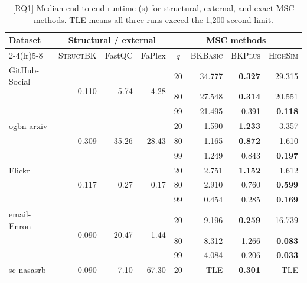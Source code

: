 \documentclass[sigconf, nonacm]{acmart}
\newcommand{\StructBK}{\textsc{Struct\-BK}}
\begin{document}
\begin{table}[!t]
\footnotesize
\centering
\caption{[RQ1] Median end-to-end runtime (s) for structural, external, and exact MSC methods. TLE means all three runs exceed the 1,200-second limit.}
\label{tab:main-runtime}
\vspace{-3mm}
\setlength{\tabcolsep}{1.55pt}
\renewcommand{\arraystretch}{1.02}
\begin{tabular*}{0.99\columnwidth}{@{\extracolsep{\fill}}lrrrcrrr@{}}
\toprule
\multirow{2}{*}{Dataset} & \multicolumn{3}{c}{Structural / external} & \multicolumn{4}{c}{MSC methods} \\
\cmidrule(lr){2-4}\cmidrule(lr){5-8}
& \StructBK & FastQC & FaPlex & $q$ & \textsc{BKBasic} & \textsc{BKPlus} & \textsc{HighSim} \\
\midrule
GitHub-Social & \multirow{3}{*}{0.110} & \multirow{3}{*}{5.74} & \multirow{3}{*}{4.28} & 20 & 34.777 & \cellcolor{bestgreen}\textbf{0.327} & 29.315 \\
 & & & & 80 & 27.548 & \cellcolor{bestgreen}\textbf{0.314} & 20.551 \\
 & & & & 99 & 21.495 & 0.391 & \cellcolor{bestgreen}\textbf{0.118} \\
\midrule
ogbn-arxiv & \multirow{3}{*}{0.309} & \multirow{3}{*}{35.26} & \multirow{3}{*}{28.43} & 20 & 1.590 & \cellcolor{bestgreen}\textbf{1.233} & 3.357 \\
 & & & & 80 & 1.165 & \cellcolor{bestgreen}\textbf{0.872} & 1.610 \\
 & & & & 99 & 1.249 & 0.843 & \cellcolor{bestgreen}\textbf{0.197} \\
\midrule
Flickr & \multirow{3}{*}{0.117} & \multirow{3}{*}{0.27} & \multirow{3}{*}{0.17} & 20 & 2.751 & \cellcolor{bestgreen}\textbf{1.152} & 1.612 \\
 & & & & 80 & 2.910 & 0.760 & \cellcolor{bestgreen}\textbf{0.599} \\
 & & & & 99 & 0.454 & 0.285 & \cellcolor{bestgreen}\textbf{0.169} \\
\midrule
email-Enron & \multirow{3}{*}{0.090} & \multirow{3}{*}{20.47} & \multirow{3}{*}{1.44} & 20 & 9.196 & \cellcolor{bestgreen}\textbf{0.259} & 16.739 \\
 & & & & 80 & 8.312 & 1.266 & \cellcolor{bestgreen}\textbf{0.083} \\
 & & & & 99 & 4.084 & 0.206 & \cellcolor{bestgreen}\textbf{0.033} \\
\midrule
sc-nasasrb & \multirow{3}{*}{0.090} & \multirow{3}{*}{7.10} & \multirow{3}{*}{67.30} & 20 & TLE & \cellcolor{bestgreen}\textbf{0.301} & TLE \\

\end{tabular*}
\end{table}
\end{document}
